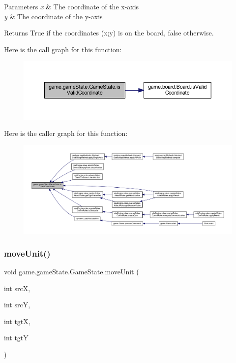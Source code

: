 \begin{DoxyParams}{Parameters}
{\em x} & The coordinate of the x-\/axis \\
\hline
{\em y} & The coordinate of the y-\/axis \\
\hline
\end{DoxyParams}
\begin{DoxyReturn}{Returns}
True if the coordinates (x;y) is on the board, false otherwise. 
\end{DoxyReturn}
Here is the call graph for this function\+:
\nopagebreak
\begin{figure}[H]
\begin{center}
\leavevmode
\includegraphics[width=350pt]{classgame_1_1game_state_1_1_game_state_aa60313a4c02762b0b05c5474cb3a987f_cgraph}
\end{center}
\end{figure}
Here is the caller graph for this function\+:
\nopagebreak
\begin{figure}[H]
\begin{center}
\leavevmode
\includegraphics[width=350pt]{classgame_1_1game_state_1_1_game_state_aa60313a4c02762b0b05c5474cb3a987f_icgraph}
\end{center}
\end{figure}
\mbox{\label{classgame_1_1game_state_1_1_game_state_aea3d3b45856b36e86e0792b2fe3fdca5}} 
\subsubsection{\texorpdfstring{move\+Unit()}{moveUnit()}}
{\footnotesize\ttfamily void game.\+game\+State.\+Game\+State.\+move\+Unit (\begin{DoxyParamCaption}\item[{int}]{srcX,  }\item[{int}]{srcY,  }\item[{int}]{tgtX,  }\item[{int}]{tgtY }\end{DoxyParamCaption})\hspace{0.3cm}{\ttfamily [inline]}}

